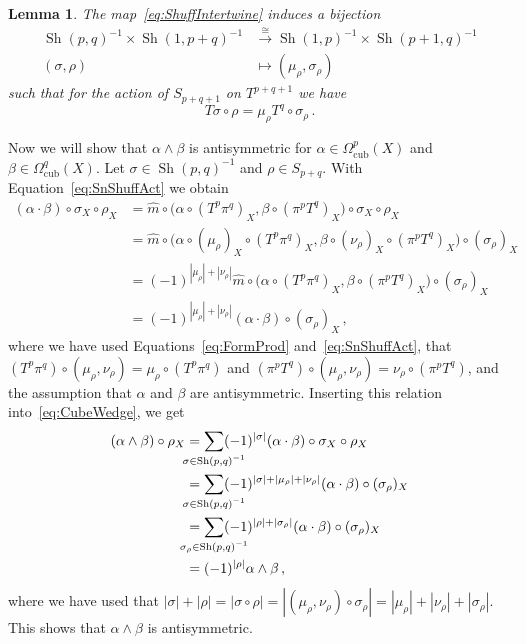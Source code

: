 \documentclass[12pt,reqno, a4paper]{amsart}
\numberwithin{equation}{section}
\theoremstyle{plain}
\newtheorem{Lemma}[Theorem]{Lemma}
\theoremstyle{definition}
\theoremstyle{remark}
\DeclareMathOperator{\Shuff}{Sh}
\newcommand{\Rmult}{\hat{m}}
\begin{document}
\begin{Lemma}
\label{lem:ShuffShuff}
The map~\eqref{eq:ShuffIntertwine} induces a bijection
\begin{align*}
  \Shuff(p,q)^{-1} \times \Shuff(1,p+q)^{-1}
  &\xrightarrow{~\cong~}
  \Shuff(1,p)^{-1} \times \Shuff(p+1,q)^{-1}
  \\
  (\sigma, \rho) &\longmapsto (\mu_\rho, \sigma_\rho)
\end{align*}
such that for the action of $S_{p+q+1}$ on $T^{p+q+1}$ we have
\begin{equation}
\label{eq:ShuffShuff01}
  T\sigma \circ \rho
  = \mu_\rho T^q \circ \sigma_\rho
  \,.
\end{equation}
\end{Lemma}

Now we will show that $\alpha \wedge \beta$ is antisymmetric for $\alpha \in \Omega^p_\mathrm{cub}(X)$ and $\beta \in \Omega^q_\mathrm{cub}(X)$. Let $\sigma \in \Shuff(p,q)^{-1}$ and $\rho \in S_{p+q}$. With Equation~\eqref{eq:SnShuffAct} we obtain
\begin{equation*}
\begin{split}
  (\alpha \cdot \beta) \circ \sigma_X \circ \rho_X
  &=
  \Rmult\circ\bigl(\alpha\circ (T^p\pi^q)_X,\beta\circ(\pi^pT^q)_X\bigr) \circ
  \sigma_X \circ \rho_X
  \\
  &=
  \Rmult\circ\bigl(
  \alpha \circ (\mu_\rho)_X \circ (T^p\pi^q)_X,
  \beta  \circ (\nu_\rho)_X \circ (\pi^pT^q)_X\bigr) \circ
  (\sigma_\rho)_X
  \\
  &= (-1)^{|\mu_\rho| + |\nu_\rho|}
  \Rmult\circ\bigl(
  \alpha \circ (T^p\pi^q)_X,
  \beta  \circ (\pi^pT^q)_X\bigr) \circ
  (\sigma_\rho)_X
  \\
  &= (-1)^{|\mu_\rho| + |\nu_\rho|}
  (\alpha \cdot \beta) \circ (\sigma_\rho)_X
  \,,
\end{split}
\end{equation*}
where we have used Equations~\eqref{eq:FormProd} and~\eqref{eq:SnShuffAct}, that $(T^p\pi^q)\circ(\mu_\rho,\nu_\rho)=\mu_\rho\circ(T^p\pi^q)$ and $(\pi^pT^q)\circ(\mu_\rho,\nu_\rho)=\nu_\rho\circ(\pi^pT^q)$, and the assumption that $\alpha$ and $\beta$ are antisymmetric. Inserting this relation into~\eqref{eq:CubeWedge}, we get
\begin{equation}
\begin{split}
  (\alpha \wedge \beta) \circ \rho_X
  &=
  \sum_{\mathclap{\sigma \in \Shuff(p,q)^{-1}}}
  (-1)^{|\sigma|}
  (\alpha \cdot \beta) \circ \sigma_X \circ \rho_X
  \\
  &=
  \sum_{\mathclap{\sigma \in \Shuff(p,q)^{-1}}}
  (-1)^{|\sigma| + |\mu_\rho| + |\nu_\rho|}
  (\alpha \cdot \beta) \circ (\sigma_\rho)_X
  \\
  &=
  \sum_{\mathclap{\sigma_\rho \in \Shuff(p,q)^{-1}}}
  (-1)^{|\rho| + |\sigma_\rho|}
  (\alpha \cdot \beta) \circ (\sigma_\rho)_X
  \\
  &=
  (-1)^{|\rho|} \alpha \wedge \beta
  \,,
\end{split}
\end{equation}
where we have used that $|\sigma| + |\rho| = |\sigma \circ \rho| = |(\mu_\rho,\nu_\rho)\circ \sigma_\rho| = |\mu_\rho| + |\nu_\rho| + |\sigma_\rho|$. This shows that $\alpha \wedge \beta$ is antisymmetric.
\end{document}
